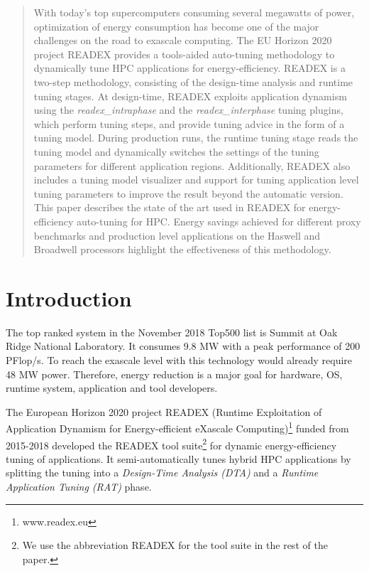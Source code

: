 \documentclass[runningheads]{llncs}
\begin{document}
\begin{abstract}
With today's top supercomputers consuming several mega\-watts of power, optimization of energy consumption has become one of the major challenges on the road to exascale computing.
The EU Horizon 2020 project READEX provides a tools-aided auto-tuning methodology to dynamically tune HPC applications for energy-efficiency. READEX is a two-step methodology, consisting of the design-time analysis and runtime tuning stages. At design-time, READEX exploits application dynamism using the \textit{readex\_intraphase} and the \textit{readex\_interphase} tuning plugins, which perform tuning steps, and provide tuning advice in the form of a tuning model. During production runs, the runtime tuning stage reads the tuning model and dynamically switches the settings of the tuning parameters for different application regions. Additionally, READEX also includes a tuning model visualizer and support for tuning application level tuning parameters to improve the result beyond the automatic version. This paper describes the state of the art used in READEX for energy-efficiency auto-tuning for HPC. Energy savings achieved for different proxy benchmarks and production level applications on the Haswell and Broadwell processors highlight the effectiveness of this methodology.

\end{abstract}

\section{Introduction} \label{sec:introduction}

The top ranked system in the November 2018 Top500 list is Summit at Oak Ridge National Laboratory. It consumes 9.8 MW with a peak performance of 200 PFlop/s. To reach the exascale level with this technology would already require 48 MW power. Therefore, energy reduction is a major goal for hardware, OS, runtime system, application and tool developers. 

The European Horizon 2020 project READEX (Runtime Exploitation of Application Dynamism for Energy-efficient eXascale Computing)\footnote{www.readex.eu} funded from 2015-2018 developed the READEX tool suite\footnote{We use the abbreviation READEX for the tool suite in the rest of the paper.} for dynamic energy-efficiency tuning of applications. It semi-automatically tunes hybrid HPC applications by splitting the tuning into a \textit{Design-Time Analysis (DTA)} and a \textit{Runtime Application Tuning (RAT)} phase. 
\end{document}
